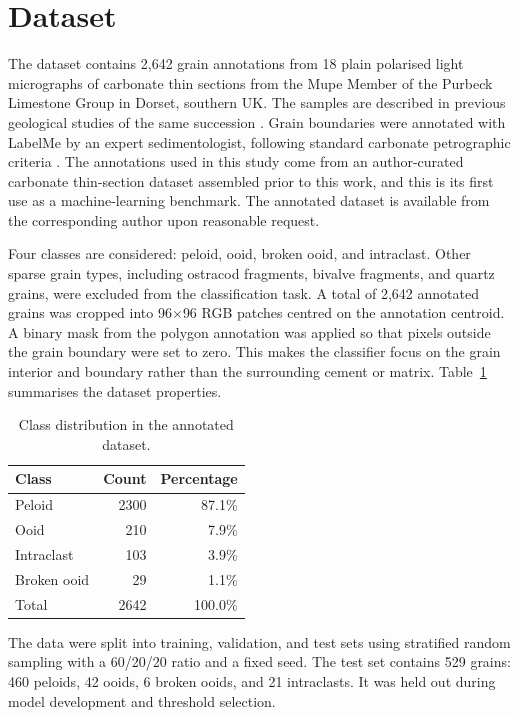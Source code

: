\documentclass[conference, a4paper]{IEEEtran}
\begin{document}
\section{Dataset}
The dataset contains 2,642 grain annotations from 18 plain polarised light micrographs of carbonate thin sections from the Mupe Member of the Purbeck Limestone Group in Dorset, southern UK. The samples are described in previous geological studies of the same succession \cite{gallois2016,gallois2018}. Grain boundaries were annotated with LabelMe \cite{labelme} by an expert sedimentologist, following standard carbonate petrographic criteria \cite{scholle2003carbonate,flugel2010}. The annotations used in this study come from an author-curated carbonate thin-section dataset assembled prior to this work, and this is its first use as a machine-learning benchmark. The annotated dataset is available from the corresponding author upon reasonable request.

Four classes are considered: peloid, ooid, broken ooid, and intraclast. Other sparse grain types, including ostracod fragments, bivalve fragments, and quartz grains, were excluded from the classification task. A total of 2,642 annotated grains was cropped into 96$\times$96 RGB patches centred on the annotation centroid. A binary mask from the polygon annotation was applied so that pixels outside the grain boundary were set to zero. This makes the classifier focus on the grain interior and boundary rather than the surrounding cement or matrix. Table~\ref{tab:class_distribution} summarises the dataset properties.

\begin{table}[b]
\caption{Class distribution in the annotated dataset.}
\label{tab:class_distribution}
\centering
\begin{tabular}{lrr}
\toprule
Class & Count & Percentage \\
\midrule
Peloid & 2300 & 87.1\% \\
Ooid & 210 & 7.9\% \\
Intraclast & 103 & 3.9\% \\
Broken ooid & 29 & 1.1\% \\
\midrule
Total & 2642 & 100.0\% \\
\bottomrule
\end{tabular}
\end{table}

The data were split into training, validation, and test sets using stratified random sampling with a 60/20/20 ratio and a fixed seed. The test set contains 529 grains: 460 peloids, 42 ooids, 6 broken ooids, and 21 intraclasts. It was held out during model development and threshold selection.
\end{document}
